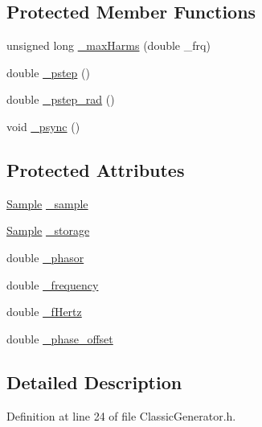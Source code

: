 \subsection*{Protected Member Functions}
\begin{DoxyCompactItemize}
\item 
unsigned long \hyperlink{class_signal_1_1_classic_generator_a7457e912d428de4e3fc27ec7fc49890e}{\+\_\+max\+Harms} (double \+\_\+frq)
\item 
double \hyperlink{class_signal_1_1_classic_generator_a255330ce8049b6e6d101b8d356cebe3d}{\+\_\+pstep} ()
\item 
double \hyperlink{class_signal_1_1_classic_generator_a6571276f584ff0be3862243d0f103a92}{\+\_\+pstep\+\_\+rad} ()
\item 
void \hyperlink{class_signal_1_1_classic_generator_a6454565b655bff7b8335735c2fabb4af}{\+\_\+psync} ()
\end{DoxyCompactItemize}
\subsection*{Protected Attributes}
\begin{DoxyCompactItemize}
\item 
\hyperlink{class_signal_1_1_sample}{Sample} \hyperlink{class_signal_1_1_classic_generator_a40313d0d806d6e44af7d41b3ef3a0822}{\+\_\+sample}
\item 
\hyperlink{class_signal_1_1_sample}{Sample} \hyperlink{class_signal_1_1_classic_generator_a1214faf589eccb01631700723900bbf9}{\+\_\+storage}
\item 
double \hyperlink{class_signal_1_1_classic_generator_ade9b66bc49d2d2f40a1390fc6374b8b2}{\+\_\+phasor}
\item 
double \hyperlink{class_signal_1_1_signal_generator_a7f107461333bce68c5dad412db96a8c2}{\+\_\+frequency}
\item 
double \hyperlink{class_signal_1_1_signal_generator_a85a4702347352bab1c71e0a8df8437d6}{\+\_\+f\+Hertz}
\item 
double \hyperlink{class_signal_1_1_signal_generator_a6b4444d46747c8517171edbbf4b5588f}{\+\_\+phase\+\_\+offset}
\end{DoxyCompactItemize}


\subsection{Detailed Description}


Definition at line 24 of file Classic\+Generator.\+h.



